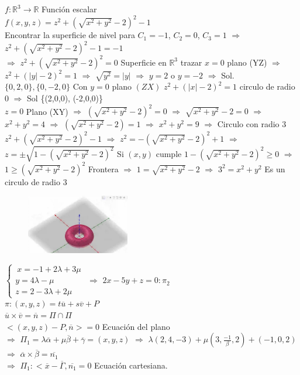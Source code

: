 \documentclass[secnumarabic,balancelastpage,amsmath,amssymb]{article}
\providecommand{\abs}[1]{\lvert#1\rvert}
\theoremstyle{remark}
\theoremstyle{definition}
\theoremstyle{prop}
\begin{document}
$f: \mathbb{R}^{3} \rightarrow \mathbb{R}$ Función escalar \\
$f(x,y,z)=z^{2}+(\sqrt{x^{2}+y^{2}}-2)^{2}-1$\\
Encontrar la superficie de nivel para $C_{1}=-1$, $C_{2}=0$, $C_{3}=1$
$\Rightarrow$ $z^{2}+(\sqrt{x^{2}+y^{2}}-2)^{2}-1=-1$\\
$\Rightarrow$ $z^{2}+(\sqrt{x^{2}+y^{2}}-2)^{2}=0$ Superficie en $\mathbb{R}^{3}$ trazar $x=0$ plano (YZ) $\Rightarrow$ $z^{2}+(\abs{y}-2)^{2}=1$ $\Rightarrow$ $\sqrt{y^{2}}=\abs{y}$ $\Rightarrow$ $y=2$ o $y=-2$ $\Rightarrow$ Sol.$\{0,2,0\} , \{0,-2,0\}$ Con $y=0$ plano $(ZX)$ $z^{2}+(\abs{x}-2)^{2}=1$ circulo de radio $0$ $\Rightarrow$  Sol \{(2,0,0), (-2,0,0)\} \\
$z=0$ Plano (XY) $\Rightarrow$ $(\sqrt{x^{2}+y^{2}}-2)^{2}=0$ $\Rightarrow$ $\sqrt{x^{2}+y^{2}}-2=0$ $\Rightarrow$ $x^{2}+y^{2}=4$
$\Rightarrow$ $(\sqrt{x^{2}+y^{2}}-2)=1$ $\Rightarrow$ $x^{2}+y^{2}=9$ $\Rightarrow$ Circulo con radio $3$\\
$z^{2}+(\sqrt{x^{2}+y^{2}}-2)^{2}-1$ $\Rightarrow$ $z^{2}=-(\sqrt{x^{2}+y^{2}}-2)^{2}+1$ $\Rightarrow$ $z=\pm \sqrt{1-(\sqrt{x^{2}+y^{2}}-2)^{2}}$ Si $(x,y)$ cumple $1-(\sqrt{x^{2}+y^{2}}-2)^{2} \geq 0$ $\Rightarrow$ $1\geq(\sqrt{x^{2}+y^{2}}-2)^{2}$ Frontera $\Rightarrow$ $1=\sqrt{x^{2}+y^{2}}-2$ $\Rightarrow$ $3^{2}= x^{2}+y^{2}$ Es un circulo de radio $3$
\begin{figure}[h!]
\centering
\includegraphics[width=0.4\textwidth]{Captura6.PNG}
\label{fig:fig7.}
\end{figure}

$\left \{
      \begin{array}{rcl}
          \ x=-1+2\lambda+3\mu\\
          y=4\lambda-\mu \\ 
         z=2-3\lambda+2\mu 
      \end{array}
   \right . $  
$\Rightarrow$ $2x-5y+z=0 :\pi_{2}$\\

$\pi :(x,y,z)= t\overline{u}+s\overline{v}+P$\\ $\overline{u}\times\overline{v}=\overline{n}= \Pi \cap \Pi$ \\
$<(x,y,z)-P,\overline{n}>=0$ Ecuación del plano\\
$\Rightarrow$ $\Pi_{1}=\lambda \overline{\alpha}+\mu\overline{\beta}+\overline{\gamma}=(x,y,z)$ $\Rightarrow$ $\lambda(2,4,-3)+\mu(3,\frac{-1}{\beta},2)+(-1,0,2)$
$\Rightarrow$ $\overline{\alpha}\times \overline{\beta}=\overline{n_{1}}$\\
$\Rightarrow$ $\Pi_{1}: <\overline{x}-\overline{\Gamma},\overline{n_{1}}=0$ Ecuación cartesiana.\\
\end{document}
